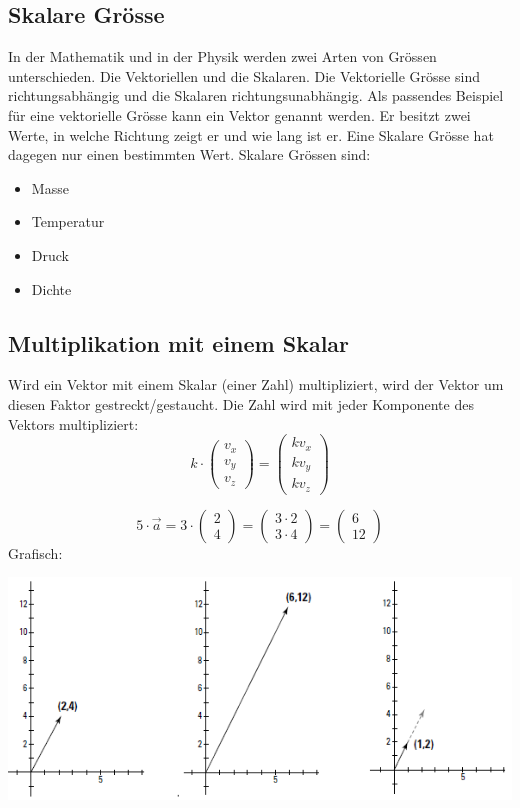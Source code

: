 \subsection{Skalare Grösse}
In der Mathematik und in der Physik werden zwei Arten von Grössen unterschieden. Die Vektoriellen und die Skalaren.
Die Vektorielle Grösse sind richtungsabhängig und die Skalaren richtungsunabhängig. Als passendes Beispiel für eine vektorielle Grösse kann ein Vektor genannt werden. Er besitzt zwei Werte, in welche Richtung zeigt er und wie lang ist er. Eine Skalare Grösse hat dagegen nur einen bestimmten Wert.
Skalare Grössen sind:
\begin{itemize}
	\item Masse
	\item Temperatur
	\item Druck
	\item Dichte
\end{itemize}
\subsection{Multiplikation mit einem Skalar}
Wird ein Vektor mit einem Skalar (einer Zahl) multipliziert, wird der Vektor um diesen Faktor gestreckt/gestaucht. Die Zahl wird mit jeder Komponente des Vektors multipliziert:
\begin{equation*}
k \cdot \begin{pmatrix}v_x\\v_y\\v_z\end{pmatrix} = \begin{pmatrix}kv_x\\kv_y\\kv_z\end{pmatrix}
\end{equation*}
\begin{myexample}
\begin{equation*}
5\cdot \vec{a} = 3\cdot \begin{pmatrix}2\\4\end{pmatrix} = \begin{pmatrix}3\cdot 2\\ 3 \cdot 4\end{pmatrix} = \begin{pmatrix}6\\12 \end{pmatrix}
\end{equation*}
Grafisch:
\begin{center}\includegraphics[scale=0.85]{imgs/VektorMultiplikation.png}\end{center}
\end{myexample}
